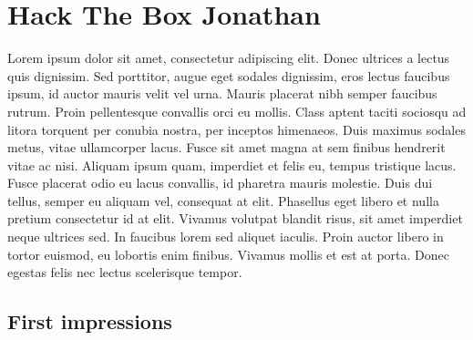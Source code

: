 \documentclass[../main.tex]{subfiles}
\begin{document}
\section{Hack The Box Jonathan}

Lorem ipsum dolor sit amet, consectetur adipiscing elit. Donec ultrices a lectus quis dignissim. Sed porttitor, augue eget sodales dignissim, eros lectus faucibus ipsum, id auctor mauris velit vel urna. Mauris placerat nibh semper faucibus rutrum. Proin pellentesque convallis orci eu mollis. Class aptent taciti sociosqu ad litora torquent per conubia nostra, per inceptos himenaeos. Duis maximus sodales metus, vitae ullamcorper lacus. Fusce sit amet magna at sem finibus hendrerit vitae ac nisi. Aliquam ipsum quam, imperdiet et felis eu, tempus tristique lacus. Fusce placerat odio eu lacus convallis, id pharetra mauris molestie. Duis dui tellus, semper eu aliquam vel, consequat at elit. Phasellus eget libero et nulla pretium consectetur id at elit. Vivamus volutpat blandit risus, sit amet imperdiet neque ultrices sed. In faucibus lorem sed aliquet iaculis. Proin auctor libero in tortor euismod, eu lobortis enim finibus. Vivamus mollis et est at porta. Donec egestas felis nec lectus scelerisque tempor.

\subsection{First impressions}
\end{document}
